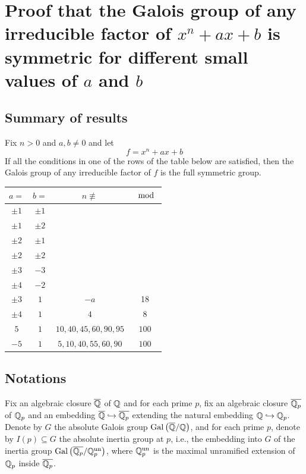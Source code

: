 \documentclass[../main.tex]{subfiles}
\begin{document}
\section{Proof that the Galois group of any irreducible factor of $x^n +ax + b$ is symmetric for different small values of $a$ and $b$} 
\localtableofcontents
\subsection{Summary of results}
Fix $n > 0$ and $a,b \neq 0$ and let 
\[
  f = x^n + ax + b
\]
If all the conditions in one of the rows of the table below are satisfied, then the Galois group of any irreducible factor of $f$ is the full symmetric group.

\begin{center}
\begin{tabular}{||c c c c||} 
 \hline
 $a = $ & $b = $ & $n \not \equiv$ & $\mod$ \\ [0.5ex] 
 \hline\hline
 $\pm 1$ & $ \pm 1$ & & \\ 
 \hline
 $\pm 1$ & $ \pm 2$ & & \\ 
 \hline
 $\pm 2$ & $\pm 1$ & & \\ 
 \hline
 $\pm 2$ & $\pm 2$ & & \\ 
 \hline
 $\pm 3$ & $-3$ & & \\ 
 \hline
 $\pm 4$ & $-2$ & & \\ 
 \hline
 $\pm 3$ & $1$ & $-a$ & 18 \\
 \hline
 $\pm 4$  & $1$ & $4$ & $8$ \\
 \hline
 $5$  & $1$ & $10,40,45,60,90,95$ & $100$\\
 \hline
 $-5$  & $1$ & $5,10,40,55,60,90$ & $100$ \\ [1ex] 
 \hline
\end{tabular}
\end{center}

\subsection{Notations}
Fix an algebraic closure $\overline{\mathbb{Q}}$ of $\mathbb{Q}$ and for each prime $p$, fix an algebraic closure $\overline{\mathbb{Q}_p}$ of $\mathbb{Q}_p$ and an embedding $\overline{\mathbb{Q}} \hookrightarrow \overline{\mathbb{Q}_p}$ extending the natural embedding $\mathbb{Q} \hookrightarrow \mathbb{Q}_p$.
Denote by $G$ the absolute Galois group $\operatorname{Gal}\left( \overline{\mathbb{Q}}/\mathbb{Q} \right)$, and for each prime $p$, denote by $I\left( p \right) \subseteq G$ the absolute inertia group at $p$, i.e., the embedding into $G$ of the inertia group $\operatorname{Gal}\left( \overline{\mathbb{Q}_p}/\mathbb{Q}_p^{\operatorname{un}} \right)$, where $\mathbb{Q}_p^{\operatorname{un}}$ is the maximal unramified extension of $\mathbb{Q}_p$ inside $\overline{\mathbb{Q}_p}$.
\end{document}
